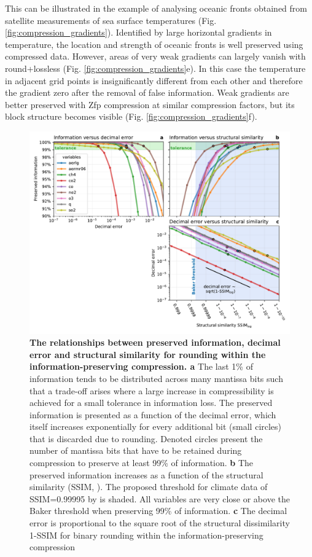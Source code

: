 This can be illustrated in the example of analysing oceanic fronts obtained from satellite measurements of sea surface
temperatures (Fig. \ref{fig:compression_gradients}). Identified by large horizontal gradients in temperature, the location
and strength of oceanic fronts is well preserved using compressed data. However, areas of very weak gradients can
largely vanish with round+lossless (Fig.  \ref{fig:compression_gradients}e). In this case the temperature in adjacent grid
points is insignificantly different from each other and therefore the gradient zero after the removal of false information.
Weak gradients are better preserved with Zfp compression at similar compression factors, but its block structure becomes
visible (Fig. \ref{fig:compression_gradients}f). 

\begin{figure}[tbhp]
	\includegraphics[width=1\textwidth]{Figures/compression/information_error_ssim.pdf}
	\caption{\textbf{The relationships between preserved information, decimal error and structural similarity for rounding within
	the information-preserving compression. a} The last 1\% of information tends to be distributed across many mantissa bits
	such that a trade-off arises where a large increase in compressibility is achieved for a small tolerance in information loss.
	The preserved information is presented as a function of the decimal error, which itself increases exponentially for
	every additional bit (small circles) that is discarded due to rounding. Denoted circles present the number of mantissa bits
	that have to be retained during compression to preserve at least 99\% of information. \textbf{b} The preserved information
	increases as a function of the structural similarity (SSIM, \cite{Wang2004}). The proposed threshold for climate data of
	SSIM=0.99995 by \cite{Baker2019} is shaded. All variables are very close or above the Baker threshold when preserving
	99\% of information. \textbf{c} The decimal error is proportional to the square root of the structural dissimilarity 1-SSIM
	for binary rounding within the information-preserving compression}
	\label{fig:information_error_ssim}
\end{figure}

